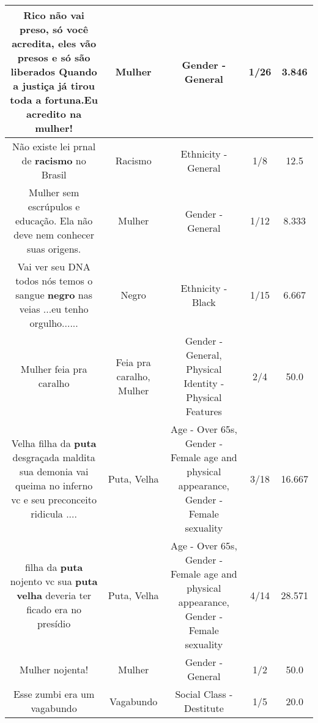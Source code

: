 \documentclass[11pt]{article}
\newlength\mylength
\begin{document}
\begin{center}
\begin{longtable}{|C{.65\mylength}|C{.30\mylength}|C{.12\mylength}|C{.12\mylength}|C{.12\mylength}|}
  \small Rico não vai preso, só você acredita, eles vão presos e só são liberados Quando a justiça já tirou toda a fortuna.Eu acredito na \textbf{mulher}!\normalsize   & Mulher & Gender - General & 1/26 & 3.846 \\  \hline
  \small Não existe lei prnal de \textbf{racismo} no Brasil\normalsize   & Racismo & Ethnicity - General & 1/8 & 12.5 \\  \hline
  \small Mulher sem escrúpulos e educação.  Ela não deve nem conhecer suas origens.\normalsize   & Mulher & Gender - General & 1/12 & 8.333 \\  \hline
  \small Vai ver seu DNA   todos nós  temos  o sangue \textbf{negro} nas veias ...eu tenho orgulho......\normalsize   & Negro & Ethnicity - Black & 1/15 & 6.667 \\  \hline
  \small Mulher feia pra caralho\normalsize   & Feia pra caralho, Mulher & Gender - General, Physical Identity - Physical Features & 2/4 & 50.0 \\  \hline
  \small Velha filha da \textbf{puta} desgraçada maldita sua demonia vai queima no inferno vc e seu preconceito ridicula ....\normalsize   & Puta, Velha & Age - Over 65s, Gender - Female age and physical appearance, Gender - Female sexuality & 3/18 & 16.667 \\  \hline
  \small filha da \textbf{puta} nojento vc sua \textbf{puta} \textbf{v\textbf{elha}} deveria ter ficado era no presídio\normalsize   & Puta, Velha & Age - Over 65s, Gender - Female age and physical appearance, Gender - Female sexuality & 4/14 & 28.571 \\  \hline
  \small Mulher nojenta!\normalsize   & Mulher & Gender - General & 1/2 & 50.0 \\  \hline
  \small Esse zumbi era um  vagabundo\normalsize   & Vagabundo & Social Class - Destitute & 1/5 & 20.0 \\  \hline

\end{longtable}
\end{center}
\end{document}

